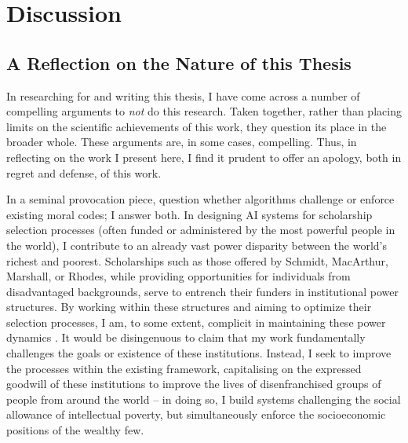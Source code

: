 

\chapter{\label{ch:discussion}Discussion}

\minitoc


\section{A Reflection on the Nature of this Thesis}
In researching for and writing this thesis, I have come across a number of compelling arguments to \emph{not} do this research. Taken together, rather than placing limits on the scientific achievements of this work, they question its place in the broader whole. These arguments are, in some cases, compelling. Thus, in reflecting on the work I present here, I find it prudent to offer an apology, both in regret and defense, of this work.

In a seminal provocation piece, \textcite{Barocas_Hood_Ziewitz_2013} question whether algorithms challenge or enforce existing moral codes; I answer both. In designing AI systems for scholarship selection processes (often funded or administered by the most powerful people in the world), I contribute to an already vast power disparity between the world's richest and poorest. Scholarships such as those offered by Schmidt, MacArthur, Marshall, or Rhodes, while providing opportunities for individuals from disadvantaged backgrounds, serve to entrench their funders in institutional power structures. By working within these structures and aiming to optimize their selection processes, I am, to some extent, complicit in maintaining these power dynamics \cite{Ziegler_2008}. It would be disingenuous to claim that my work fundamentally challenges the goals or existence of these institutions. Instead, I seek to improve the processes within the existing framework, capitalising on the expressed goodwill of these institutions to improve the lives of disenfranchised groups of people from around the world – in doing so, I build systems challenging the social allowance of intellectual poverty, but simultaneously enforce the socioeconomic positions of the wealthy few.

